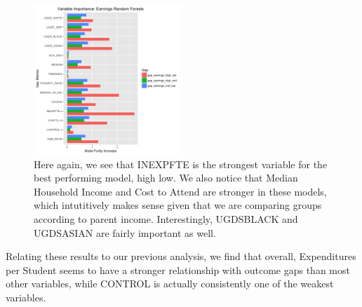 \documentclass{article}
\begin{document}
\begin{figure}[H]
\centering
\includegraphics[width=0.5\textwidth]{../images/rf_importance_earnings.png}
\caption{\label{fig: EarningsRFImportance} Here again, we see that INEXPFTE is the strongest variable for the best performing model, high low. We also notice that Median Household Income and Cost to Attend are stronger in these models, which intutitively makes sense given that we are comparing groups according to parent income. Interestingly, UGDSBLACK and UGDSASIAN are fairly important as well.}
\end{figure}

Relating these results to our previous analysis, we find that overall, Expenditures per Student seems to have a stronger relationship with outcome gaps than most other variables, while CONTROL is actually consistently one of the weakest variables. 
\end{document}

